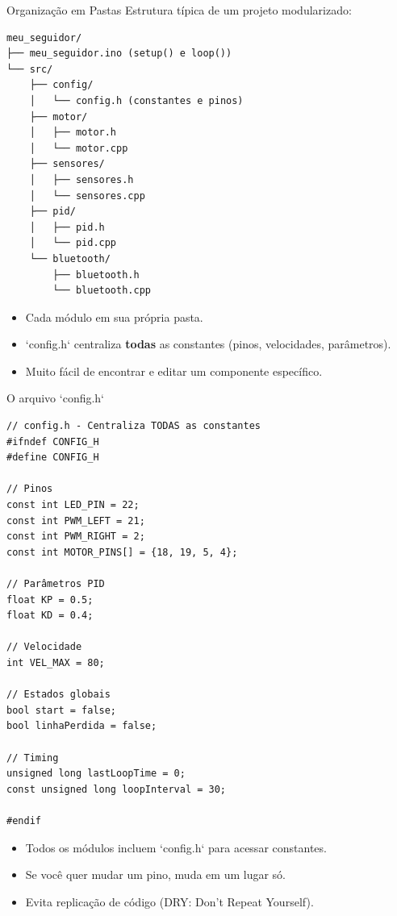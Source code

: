 \documentclass[10pt]{beamer}
\begin{document}
\begin{frame}[fragile]{Organização em Pastas}
  Estrutura típica de um projeto modularizado:
\begin{lstlisting}
meu_seguidor/
├── meu_seguidor.ino (setup() e loop())
└── src/
    ├── config/
    │   └── config.h (constantes e pinos)
    ├── motor/
    │   ├── motor.h
    │   └── motor.cpp
    ├── sensores/
    │   ├── sensores.h
    │   └── sensores.cpp
    ├── pid/
    │   ├── pid.h
    │   └── pid.cpp
    └── bluetooth/
        ├── bluetooth.h
        └── bluetooth.cpp
\end{lstlisting}

  \begin{itemize}
    \item Cada módulo em sua própria pasta.
    \item `config.h` centraliza \textbf{todas} as constantes (pinos, velocidades, parâmetros).
    \item Muito fácil de encontrar e editar um componente específico.
  \end{itemize}
\end{frame}

\begin{frame}[fragile]{O arquivo `config.h`}
\begin{lstlisting}
// config.h - Centraliza TODAS as constantes
#ifndef CONFIG_H
#define CONFIG_H

// Pinos
const int LED_PIN = 22;
const int PWM_LEFT = 21;
const int PWM_RIGHT = 2;
const int MOTOR_PINS[] = {18, 19, 5, 4};

// Parâmetros PID
float KP = 0.5;
float KD = 0.4;

// Velocidade
int VEL_MAX = 80;

// Estados globais
bool start = false;
bool linhaPerdida = false;

// Timing
unsigned long lastLoopTime = 0;
const unsigned long loopInterval = 30;

#endif
\end{lstlisting}

  \begin{itemize}
    \item Todos os módulos incluem `config.h` para acessar constantes.
    \item Se você quer mudar um pino, muda em um lugar só.
    \item Evita replicação de código (DRY: Don't Repeat Yourself).
  \end{itemize}
\end{frame}
\end{document}
